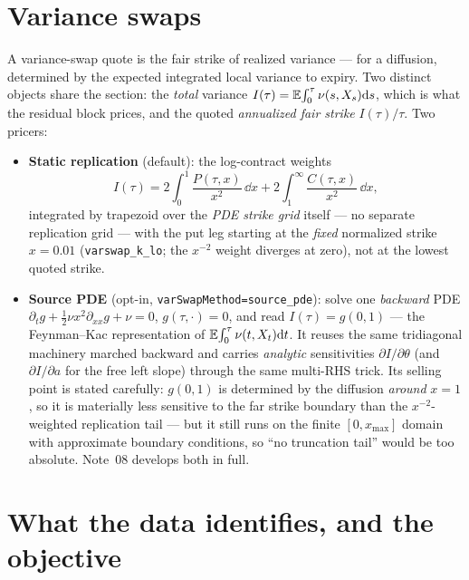 \documentclass[11pt]{article}
\begin{document}
\section{Variance swaps}
\label{sec:varswap}

A variance-swap quote is the fair strike of realized variance --- for a
diffusion, determined by the expected integrated local variance to expiry. Two
distinct objects share the section: the \emph{total} variance
$I(\tau)=\mathbb{E}\!\int_0^\tau\nu(s,X_s)\mathrm{d} s$, which is what the residual block
prices, and the quoted \emph{annualized fair strike} $I(\tau)/\tau$. Two
pricers:
\begin{itemize}[leftmargin=1.4em]
\item \textbf{Static replication} (default): the log-contract weights
\begin{equation}
I(\tau)=2\!\int_0^1\frac{P(\tau,x)}{x^2}\,\dd x+2\!\int_1^{\infty}\frac{C(\tau,x)}{x^2}\,\dd x,
\label{eq:logcontract}
\end{equation}
integrated by trapezoid over the \emph{PDE strike grid} itself --- no separate
replication grid --- with the put leg starting at the \emph{fixed} normalized
strike $x=0.01$ (\texttt{varswap\_k\_lo}; the $x^{-2}$ weight diverges at
zero), not at the lowest quoted strike.
\item \textbf{Source PDE} (opt-in, \texttt{varSwapMethod=source\_pde}): solve
one \emph{backward} PDE
$\partial_tg+\tfrac12\nu x^2\partial_{xx}g+\nu=0$, $g(\tau,\cdot)=0$, and read
$I(\tau)=g(0,1)$ --- the Feynman--Kac representation of
$\mathbb{E}\!\int_0^\tau\nu(t,X_t)\mathrm{d} t$. It reuses the same tridiagonal machinery
marched backward and carries \emph{analytic} sensitivities
$\partial I/\partial\theta$ (and $\partial I/\partial a$ for the free left
slope) through the same multi-RHS trick. Its selling point is stated
carefully: $g(0,1)$ is determined by the diffusion \emph{around} $x=1$, so it
is materially less sensitive to the far strike boundary than the
$x^{-2}$-weighted replication tail --- but it still runs on the finite
$[0,x_{\max}]$ domain with approximate boundary conditions, so ``no
truncation tail'' would be too absolute. Note~08 develops both in full.
\end{itemize}

\section{What the data identifies, and the objective}
\label{sec:objective}
\end{document}
